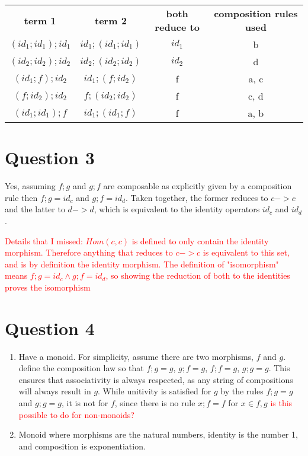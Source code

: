 \documentclass{article}
\begin{document}
\begin{enumerate}[(a)]
\begin{itemize}
            \begin{tabular}{c|c|c|c|}
                \textbf{term 1} & \textbf{term 2} & \textbf{both reduce to} & \textbf{composition rules used}\\
                $(id_1; id_1); id_1$ & $id_1; (id_1; id_1)$ & $id_1$ & b\\
                $(id_2; id_2); id_2$ & $id_2; (id_2; id_2)$ & $id_2$ & d\\
                $(id_1; f); id_2$ & $id_1; (f; id_2)$ & f & a, c\\
                $(f; id_2);id_2$ & $f;(id_2; id_2)$ & f & c, d\\
                $(id_1; id_1); f$ & $id_1; (id_1; f)$ & f & a, b
            \end{tabular}
        \end{itemize}
\end{enumerate}


\section*{Question 3}
Yes, assuming $f;g$ and $g;f$ are composable as explicitly given by a composition rule then $f;g = id_c$ and $g;f = id_d$. Taken together, the former reduces to $c->c$ and the latter to $d->d$, which is equivalent to the identity operators $id_c$ and $id_d$.

\textcolor{red}{Details that I missed: $Hom(c,c)$ is defined to only contain the identity morphism. Therefore anything that reduces to $c->c$ is equivalent to this set, and is by definition the identity morphism. The definition of "isomorphism" means $f;g=id_c \land g;f=id_d$, so showing the reduction of both to the identities proves the isomorphism}

\section*{Question 4}
\begin{enumerate}[a]
    \item Have a monoid. For simplicity, assume there are two morphisms, $f$ and $g$. define the composition law so that $f;g = g$, $g;f=g$, $f;f =g$, $g;g=g$. This ensures that associativity is always respected, as any string of compositions will always result in $g$. While unitivity is satisfied for $g$ by the rules $f;g = g$ and $g;g =g$, it is not for $f$, since there is no rule $x;f = f$ for $x \in {f,g}$
    \textcolor{red}{is this possible to do for non-monoids?}

    \item Monoid where morphisms are the natural numbers, identity is the number 1, and composition is exponentiation.
\end{enumerate}
\end{document}
